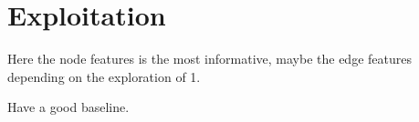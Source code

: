 \documentclass[a4paper,12pt]{article}
\begin{document}
\section{Exploitation}


Here the node features is the most informative, maybe the edge features depending on the exploration of 1.


Have a good baseline.


\end{document}
